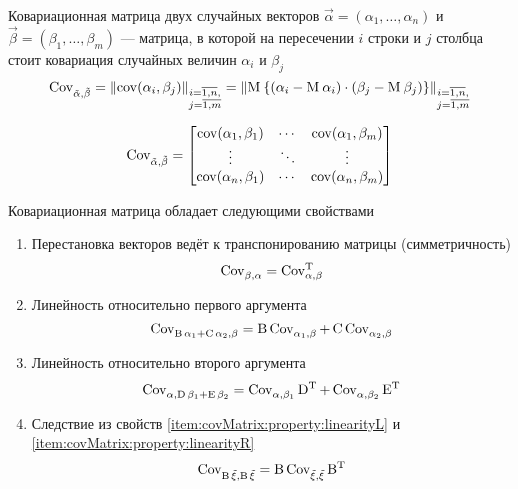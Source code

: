 \begin{definition}\label{def:covMatrix}
    Ковариационная матрица двух случайных векторов
    $\vec{\alpha} = \left( \alpha_1, \dots, \alpha_n \right)$ и
    $\vec{\beta} = \left( \beta_1, \dots, \beta_m \right)$ --- матрица,
    в которой на пересечении $i$ строки и $j$ столбца стоит ковариация случайных
    величин $\alpha_i$ и $\beta_j$
    $$\operatorname{Cov^{}_{\vec{\alpha}, \vec{\beta}}}
        = \left\| \operatorname{cov}\!\left( \alpha_i, \beta_j \right) \right\|_{
            \substack{i=\overline{1,n},\\j=\overline{1,m}}}
        = \left\| \operatorname{M}_{} 
            \left\{ \left( \alpha_i - \operatorname{M}_{} \alpha_i \right)
                \cdot \left( \beta_j - \operatorname{M}_{} \beta_j \right)
            \right\} \right\|_{
                \substack{i=\overline{1,n},\\j=\overline{1,m}}}$$

    $$\operatorname{Cov^{}_{\vec{\alpha}, \vec{\beta}}} =
    \begin{bmatrix}
        \operatorname{cov}\!\left( \alpha_1, \beta_1 \right) & \cdots & \operatorname{cov}\!\left( \alpha_1, \beta_m \right) \\
        \vdots & \ddots & \vdots \\
        \operatorname{cov}\!\left( \alpha_n, \beta_1 \right) & \cdots & \operatorname{cov}\!\left( \alpha_n, \beta_m \right)
    \end{bmatrix}$$
\end{definition}

Ковариационная матрица обладает следующими свойствами
\begin{enumerate}
    \item\label{item:covMatrix:property:transposition}
        Перестановка векторов ведёт к транспонированию матрицы (симметричность)
        $$\operatorname{Cov^{}_{\beta, \alpha}} = \operatorname{Cov^{T}_{\alpha, \beta}}$$
    \item\label{item:covMatrix:property:linearityL}
        Линейность относительно первого аргумента
        $$\operatorname{Cov^{}_{\operatorname{B} \alpha_1 + \operatorname{C} \alpha_2, \beta}}
            = \operatorname{B} \operatorname{Cov^{}_{\alpha_1, \beta}}
                + \operatorname{C}\operatorname{Cov^{}_{\alpha_2, \beta}}$$
    \item\label{item:covMatrix:property:linearityR}
        Линейность относительно второго аргумента
        $$\operatorname{Cov^{}_{\alpha, \operatorname{D} \beta_1 + \operatorname{E} \beta_2}}
            = \operatorname{Cov^{}_{\alpha, \beta_1}} \operatorname{D^T}
                + \operatorname{Cov^{}_{\alpha, \beta_2}} \operatorname{E^T}$$
    \item\label{item:covMatrix:property:operatorOut}
        Следствие из свойств \ref{item:covMatrix:property:linearityL} и
        \ref{item:covMatrix:property:linearityR}
        $$\operatorname{Cov^{}_{\operatorname{B} \vec{\xi}, \operatorname{B} \vec{\xi}}}
            = \operatorname{B} \operatorname{Cov^{}_{\vec{\xi}, \vec{\xi}}} \operatorname{B^T}$$
\end{enumerate}



